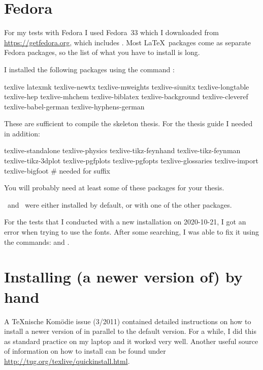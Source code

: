 \section{Fedora}%
\label{sec:app:fedora}

For my tests with Fedora I used Fedora~33 which I downloaded from
\url{https://getfedora.org},
which includes .
Most \LaTeX\ packages come as separate Fedora packages,
so the list of what you have to install is long.

I installed the following packages using the command :
\begin{bashlisting}
texlive
latexmk
texlive-newtx
texlive-mweights
texlive-siunitx
texlive-longtable
texlive-hep
texlive-mhchem
texlive-biblatex
texlive-background
texlive-cleveref
texlive-babel-german
texlive-hyphens-german
\end{bashlisting}

\noindent These are sufficient to compile the skeleton thesis.
For the thesis guide I needed in addition:
\begin{bashlisting}
texlive-standalone
texlive-physics
texlive-tikz-feynhand
texlive-tikz-feynman
texlive-tikz-3dplot
texlive-pgfplots
texlive-pgfopts
texlive-glossaries
texlive-import
texlive-bigfoot # needed for suffix
\end{bashlisting}
\noindent You will probably need at least some of these packages for your thesis.

\LuaLaTeX\ and \XeLaTeX\ were either installed by default,
or with one of the other packages.

For the tests that I conducted with a new installation on 2020-10-21,
I got an error when trying to use the  fonts.
After some searching, I was able to fix it using the commands:
 and .

  
\section{Installing (a newer version of) \TeXLive by hand}%
\label{sec:app:texlive:update}

A \TeX nische Komödie issue (3/2011) contained detailed instructions on
how to install a newer version of \TeXLive in parallel to the
default version.
For a while, I did this as standard practice on my laptop and it worked very well.
Another useful source of information on how to install \TeXLive can be found under
\url{http://tug.org/texlive/quickinstall.html}.

